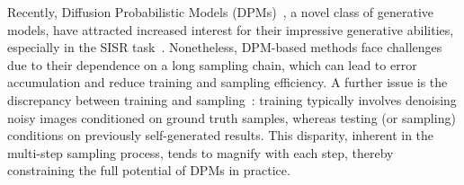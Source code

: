 Recently, Diffusion Probabilistic Models (DPMs)~\cite{ho2020denoising,sohl2015deep}, a novel class of generative models, have attracted increased interest for their impressive generative abilities, especially in the SISR task~\cite{saharia2022image,yue2023resshift,gao2023implicit,rombach2022high,ho2022cascaded}. Nonetheless, DPM-based methods face challenges due to their dependence on a long sampling chain, which can lead to error accumulation and reduce training and sampling efficiency. A further issue is the discrepancy between training and sampling~\cite{ning2023input,yu2023debias}: training typically involves denoising noisy images conditioned on ground truth samples, whereas testing (or sampling) conditions on previously self-generated results.  This disparity, inherent in the multi-step sampling process, tends to magnify with each step, thereby constraining the full potential of DPMs in practice. 


